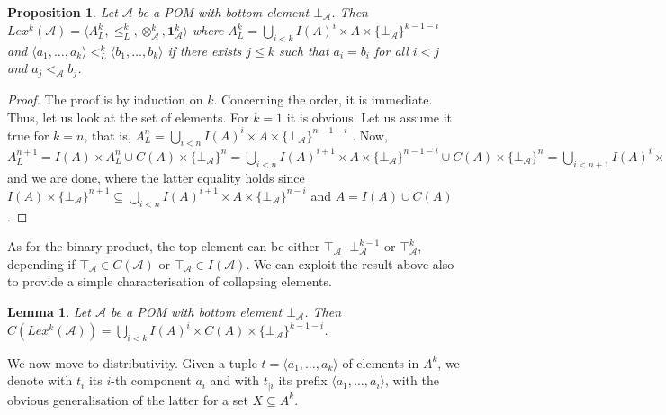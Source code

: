 \documentclass[a4paper]{elsarticle}
\newtheorem{lemma}{Lemma}
\newtheorem{proposition}{Proposition}
\newcommand{\monop}{\otimes}
\newcommand{\1}{\mathbf{1}}
\begin{document}
\begin{proposition}
	Let $\mathcal{A}$ be a POM with bottom element $\bot_\mathcal{A}$.
	Then $Lex^{k}(\mathcal{A}) = \langle A^k_L, \leq^k_L, \monop^k_\mathcal{A}, \1^k_\mathcal{A} \rangle$
	where $A^k_L = \bigcup_{i < k}I(A)^i \times A \times \{\bot_\mathcal{A}\}^{k-1-i}$
	and $\langle a_1, \ldots, a_k\rangle <^k_L \langle b_1, \ldots, b_k\rangle$ if there exists $j \leq k$ such that
	$a_i = b_i$ for all $i < j$ and %
	$a_{j} <_\mathcal{A}  b_{j}$.
\end{proposition}
\begin{proof}
	The proof is by induction on $k$. Concerning the order, it is immediate.
	Thus, let us look at the set of elements. For $k = 1$ it is obvious.
	Let us assume it true for $k = n$, that is,
	$A^n_L = \bigcup_{i < n}I(A)^i \times A \times \{\bot_\mathcal{A}\}^{n-1-i}$ .
	Now, 
	$A^{n+1}_L =  I(A) \times A^{n}_L  \cup C(A) \times \{\bot_\mathcal{A}\}^{n} =
	\bigcup_{i < n}I(A)^{i+1} \times A \times \{\bot_\mathcal{A}\}^{n-1-i} \cup C(A) \times \{\bot_\mathcal{A}\}^{n} = %
	\bigcup_{i < n+1}I(A)^{i} \times A \times \{\bot_\mathcal{A}\}^{n-i}$
	and we are done, where the latter equality holds since
	$I(A) \times \{\bot_\mathcal{A}\}^{n+1} \subseteq \bigcup_{i < n}I(A)^{i+1} \times A \times \{\bot_\mathcal{A}\}^{n-i}$
	and $A = I(A) \cup C(A)$.
\end{proof}

As for the binary product, the top element can be 
either $\top_\mathcal{A} \cdot \bot^{k-1}_\mathcal{A}$ or $\top^k_\mathcal{A}$,
depending if $\top_\mathcal{A} \in C(\mathcal{A})$ or $\top_\mathcal{A} \in I(\mathcal{A})$.
%
We can exploit the result above also to provide a simple characterisation of collapsing elements.

\begin{lemma}
	Let $\mathcal{A}$ be a POM with bottom element $\bot_\mathcal{A}$.
	Then $C(Lex^{k}(\mathcal{A})) = \bigcup_{i < k}I(A)^i \times C(A) \times \{\bot_\mathcal{A}\}^{k-1-i}$.
\end{lemma}


We now move to distributivity. 
Given a tuple $t = \langle a_1, \ldots, a_k \rangle$ of elements in $A^k$, we denote with $t_i$ its 
$i$-th component $a_i$ and with $t_{\mid i}$ its prefix $\langle a_1, \ldots, a_i \rangle$,
with the obvious generalisation of the latter for a set $X \subseteq A^k$.
\end{document}
